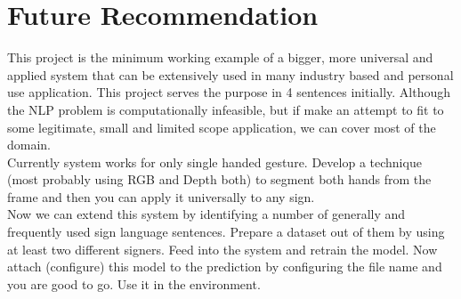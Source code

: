 \chapter{Future Recommendation}

This project is the minimum working example of a bigger, more universal and applied system that can be extensively used in many industry based and personal use application. This project serves the purpose in 4 sentences initially. Although the NLP problem is computationally infeasible, but if make an attempt to fit to some legitimate, small and limited scope application, we can cover most of the domain. \\

Currently system works for only single handed gesture. Develop a technique (most probably using RGB and Depth both) to segment both hands from the frame and then you can apply it universally to any sign.\\

Now we can extend this system by identifying a number of generally and frequently used sign language sentences. Prepare a dataset out of them by using at least two different signers. Feed into the system and retrain the model. Now attach (configure) this model to the prediction by configuring the file name and you are good to go. Use it in the environment.
